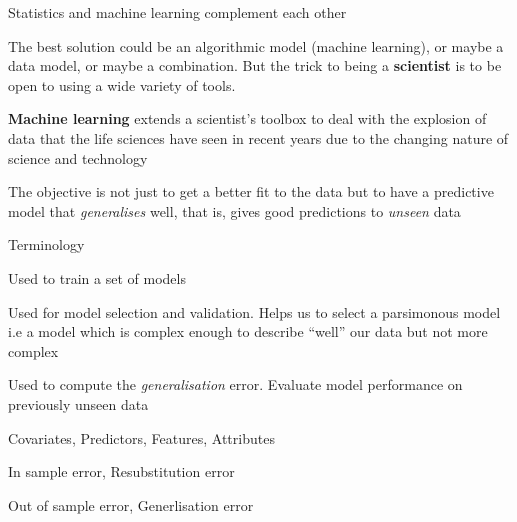 \documentclass[pdf]{beamer}
\begin{document}
\normalsize
\begin{frame}{Statistics and machine learning complement each other}
\begin{exampleblock}{}
{\small The best solution could be an algorithmic model (machine learning), or maybe a data model, or maybe a combination. But the trick to being a \textbf{scientist} is to be open to using a wide variety of tools.}
\vskip5mm
\hspace*{}
\end{exampleblock}
\vfill
\begin{exampleblock}{}
{\small \textbf{Machine learning} extends a scientist's toolbox to deal with the explosion of data that the life sciences have seen in recent years due to the changing nature of science and technology}
\end{exampleblock}
\vfill
\begin{framed}
The objective is not just to get a better fit to the data but to have a predictive model that \textit{generalises} well, that is, gives good predictions to \textit{unseen} data 
\end{framed}
\end{frame}
\begin{frame}{Terminology}
\begin{description}\addtolength{\itemsep}{0.5\baselineskip}
	\item<2->[Training Dataset:] Used to train a set of models
	\item<3->[Validation Dataset:] Used for model selection and validation. Helps us to select a 
	parsimonous model i.e a model which is complex enough to describe ``well'' our data but not more 
	complex
	\item<4->[Testing Dataset:] Used to compute the \textit{generalisation} error. Evaluate model
	performance on previously unseen data 
	\item<5->[Inputs:] Covariates, Predictors, Features, Attributes
	\item<6->[Training error:] In sample error, Resubstitution error
	\item<7->[Testing error:] Out of sample error, Generlisation error
\end{description}
\end{frame}
\end{document}
